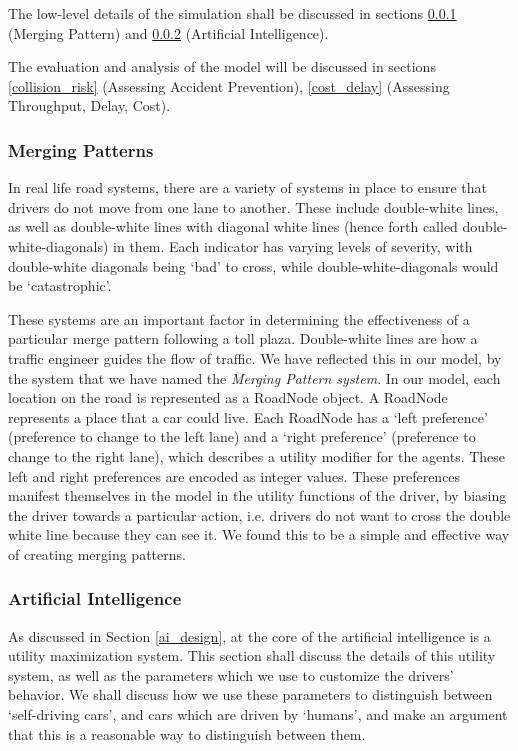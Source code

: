 \documentclass[a4paper, 11pt]{article}
\begin{document}
The low-level details of the simulation shall be discussed in sections \ref{lane_top} (Merging Pattern) and \ref{ai_impl} (Artificial Intelligence). %

The evaluation and analysis of the model will be discussed in sections \ref{collision_risk} (Assessing Accident Prevention), \ref{cost_delay} (Assessing Throughput, Delay, Cost). %

\subsubsection{Merging Patterns}
\label{lane_top}

In real life road systems, there are a variety of systems in place to ensure that drivers do not move from one lane to another. These include double-white lines, as well as double-white lines with diagonal white lines (hence forth called double-white-diagonals) in them. Each indicator has varying levels of severity, with double-white diagonals being `bad' to cross, while double-white-diagonals would be `catastrophic'. 

These systems are an important factor in determining the effectiveness of a particular merge pattern following a toll plaza. Double-white lines are how a traffic engineer guides the flow of traffic. We have reflected this in our model, by the system that we have named the \textit{Merging Pattern system}. 
In our model, each location on the road is represented as a RoadNode object.
A RoadNode represents a place that a car could live. Each RoadNode has a `left preference' (preference to change to the left lane) and a `right preference' (preference to change to the right lane), which describes a utility modifier for the agents. These left and right preferences are encoded as integer values. These preferences manifest themselves in the model in the utility functions of the driver, by biasing the driver towards a particular action, i.e. drivers do not want to cross the double white line because they can see it. We found this to be a simple and effective way of creating merging patterns. 


\subsubsection{Artificial Intelligence}
\label{ai_impl}

As discussed in Section \ref{ai_design}, at the core of the artificial intelligence is a utility maximization system. This section shall discuss the details of this utility system, as well as the parameters which we use to customize the drivers' behavior. We shall discuss how we use these parameters to distinguish between `self-driving cars', and cars which are driven by `humans', and make an argument that this is a reasonable way to distinguish between them. 
\end{document}
